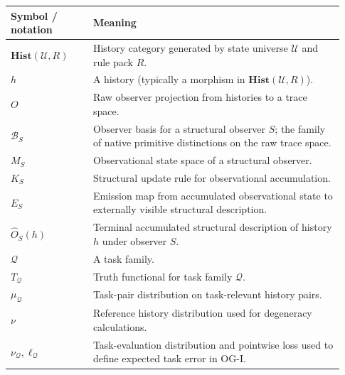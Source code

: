 \documentclass[11pt,twoside]{article}
\newcommand{\TableHeaderRow}{\rowcolor{tableheaderbg}\bfseries}
\theoremstyle{definition}
\newcommand{\Hist}{\mathbf{Hist}}
\begin{document}
\begingroup
\small
\renewcommand{\arraystretch}{0.96}
\begin{center}
\begin{tabular}{p{0.23\linewidth} p{0.70\linewidth}}
\toprule
\TableHeaderRow
Symbol / notation & Meaning \\
\midrule

\(\Hist(\mathcal{U},R)\) &
History category generated by state universe \(\mathcal{U}\) and rule pack \(R\). \\[4pt]

\(h\) &
A history (typically a morphism in \(\Hist(\mathcal{U},R)\)). \\[4pt]

\(O\) &
Raw observer projection from histories to a trace space. \\[4pt]

\(\mathcal{B}_S\) &
Observer basis for a structural observer \(S\); the family of native primitive distinctions on the raw trace space. \\[4pt]

\(M_S\) &
Observational state space of a structural observer. \\[4pt]

\(K_S\) &
Structural update rule for observational accumulation. \\[4pt]

\(E_S\) &
Emission map from accumulated observational state to externally visible structural description. \\[4pt]

\(\widehat{O}_S(h)\) &
Terminal accumulated structural description of history \(h\) under observer \(S\). \\[4pt]

\(\mathcal{Q}\) &
A task family. \\[4pt]

\(T_{\mathcal{Q}}\) &
Truth functional for task family \(\mathcal{Q}\). \\[4pt]

\(\mu_{\mathcal{Q}}\) &
Task-pair distribution on task-relevant history pairs. \\[4pt]

\(\nu\) &
Reference history distribution used for degeneracy calculations. \\[4pt]

\(\nu_{\mathcal{Q}},\ell_{\mathcal{Q}}\) &
Task-evaluation distribution and pointwise loss used to define expected task error in OG-I. \\[4pt]


\end{tabular}
\end{center}
\end{document}

